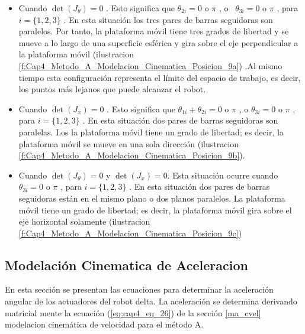         \begin{itemize}
	        \item {\fontsize{10pt}{12.0pt}\selectfont Cuando  $\det  \left( J_{ \theta } \right) =0$ . Esto significa que  $\theta _{2i}=0$  o  $\pi$ , o \   $\theta _{3i}=0$ o  $\pi$  , para  \( i = \{ 1,2 ,3 \}  \) . En esta situación los tres pares de barras seguidoras son paralelos. Por tanto, la plataforma móvil tiene tres grados de libertad y se mueve a lo largo de una superficie esférica y gira sobre el eje perpendicular a la plataforma móvil (ilustracion \ref{f:Cap4_Metodo_A_Modelacion_Cinematica_Posicion_9a}) .Al mismo tiempo esta configuración representa el límite del espacio de trabajo, es decir, los puntos más lejanos que puede alcanzar el robot. }

	        \item {\fontsize{10pt}{12.0pt}\selectfont Cuando  $\det  \left( J_{x} \right) =0 $ . Esto significa que    $ \theta _{1i}+  \theta _{2i}=0$  o  $\pi$ , o $\theta _{3i}=0$  o  $ \pi $   , para  \( i = \{ 1,2 ,3 \}  \) . En esta situación dos pares de barras seguidoras son paralelas. Los la plataforma móvil tiene un grado de libertad; es decir, la plataforma móvil se mueve en una sola dirección (ilustracion \ref{f:Cap4_Metodo_A_Modelacion_Cinematica_Posicion_9b}).}

	        \item {\fontsize{10pt}{12.0pt}\selectfont Cuando $ \det  \left( J_{ \theta } \right) =0 $  y $ \det  \left( J_{x} \right) =0 $. Esta situación ocurre cuando  $  \theta _{3i}=0$ o  $ \pi  $  , para  \( i = \{ 1,2 ,3 \}  \) . En esta situación dos pares de barras seguidoras están en el mismo plano o dos planos paralelos. La plataforma móvil tiene un grado de libertad; es decir, la plataforma móvil gira sobre el eje horizontal solamente (ilustracion \ref{f:Cap4_Metodo_A_Modelacion_Cinematica_Posicion_9c})}
\end{itemize}

    
    \newpage
    
    \subsection{Modelación Cinematica de Aceleracion}\label{ma_acel}

    En esta sección se presentan las ecuaciones para determinar la aceleración angular de los actuadores del robot delta. La aceleración se determina derivando matricial mente la ecuación (\ref{eq:cap4_eq_26}) de la sección \ref{ma_cvel} modelacion cinemática de velocidad para el método A.

